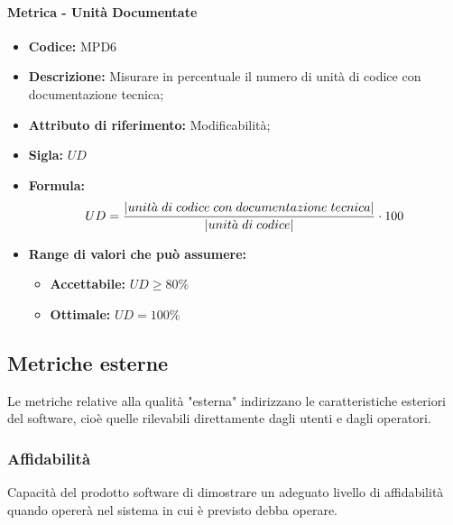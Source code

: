 \paragraph{Metrica - Unità Documentate} 
\begin{itemize}
    \item \textbf{Codice:} MPD6
    \item \textbf{Descrizione:} Misurare in percentuale il numero di unità di codice con documentazione tecnica;
    \item \textbf{Attributo di riferimento:} Modificabilità;
    \item \textbf{Sigla:} $UD$
    \item \textbf{Formula:} $$UD = {|unit\grave{a} \; di \; codice \; con \; documentazione \; tecnica| \over |unit\grave{a} \; di \; codice|} \cdot 100$$
    \item \textbf{Range di valori che può assumere:}
    \begin{itemize}
        \item \textbf{Accettabile:} $UD \geq 80\%  $
        \item \textbf{Ottimale:} $UD = 100\%$
    \end{itemize}
\end{itemize}
              
       
\subsection{Metriche esterne}
Le metriche relative alla qualità "esterna" indirizzano le caratteristiche esteriori del software, cioè quelle rilevabili direttamente dagli utenti e dagli operatori.

\subsubsection{Affidabilità}
Capacità del prodotto software di dimostrare un adeguato livello di affidabilità quando opererà nel sistema in cui è previsto debba operare.
    
